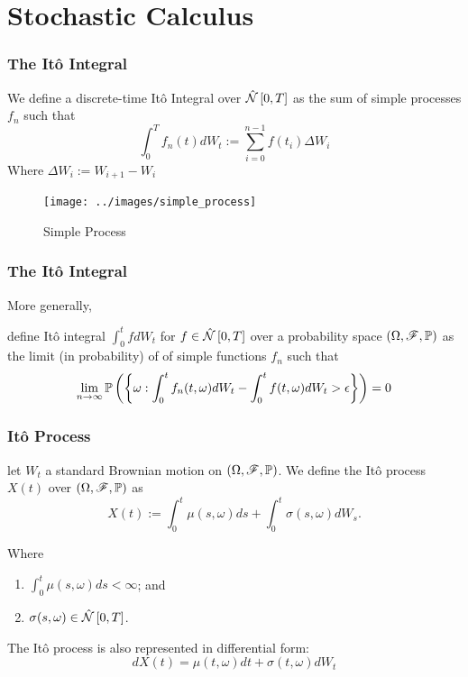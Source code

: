 \documentclass{beamer}
\begin{document}
\section{Stochastic Calculus}
\begin{frame}
	\frametitle{The It\^o Integral}
	We define a discrete-time It\^o Integral over $\hat{\mathcal{N}}\left[0, T\right]$ as the sum of simple processes $f_n$ such that
	\begin{equation}
		\int_0^T f_n(t) dW_t := \sum_{i=0}^{n-1}f(t_i) \Delta W_i
	\end{equation}
	Where $\Delta W_i := W_{i+1} - W_i$
\end{frame}

\begin{frame}
	\begin{figure}[hbt]
  \texttt{[image: ../images/simple\_process]}
  \caption{Simple Process}
\end{figure}
\end{frame}

\begin{frame}
	\frametitle{The It\^o Integral}
	More generally, 
	\begin{definition}
	define It\^o integral $\int_0^t fdW_t$ for $f\in \hat{\mathcal{N}}\left[0, T\right]$ over a probability space $(\Omega, \mathscr{F}, \mathbb{P})$ as the limit (in probability) of of simple functions $f_n$ such that
		\begin{equation}
		\lim_{n\to \infty} \mathbb{P}\left(\left\{\omega: \int_0^t f_n(t,\omega)dW_t - \int_0^t f(t,\omega)dW_t > \epsilon\right\} \right) = 0
	\end{equation}
	\end{definition}
\end{frame}

\begin{frame}
\frametitle{It\^o Process}
\begin{definition}
	let $W_t$ a standard Brownian motion on $(\Omega, \mathscr{F}, \mathbb{P})$. We define the It\^o process $X(t)$ over $(\Omega, \mathscr{F}, \mathbb{P})$ as
	\begin{equation}
		X(t) := \int_0^t\mu(s,\omega) ds  + \int_0^t\sigma(s,\omega) dW_s.
	\end{equation}
		
	Where
	\begin{enumerate}
		\item $\int_0^t \mu(s,\omega) ds < \infty$; and
		\item $\sigma(s,\omega) \in \hat{\mathcal{N}}\left[0, T\right]$.
	\end{enumerate}
\end{definition}

The It\^o process is also represented in differential form:
\begin{equation*}
	dX(t) = \mu(t,\omega) dt + \sigma(t,\omega) dW_t
\end{equation*}
\end{frame}
\end{document}
